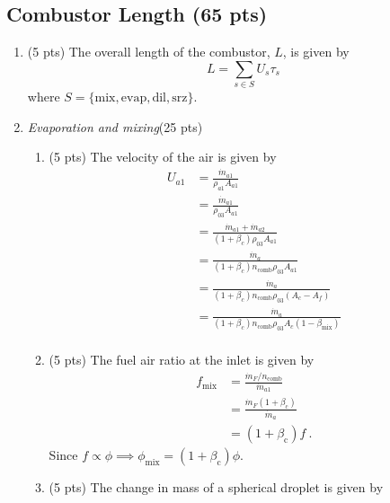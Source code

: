 \documentclass[12pt]{article}
\begin{document}
\subsection{Combustor Length (65 pts)}
	\begin{enumerate}[label=(\alph*)]
		\item (5 pts)
			The overall length of the combustor, $L$, is given by
			\begin{equation}
				L = \sum_{s\in S}U_s\tau_s
			\end{equation} 
			where $S=\{\mathrm{mix,evap,dil,srz}\}$.
		\item \textit{Evaporation and mixing}(25 pts)
			\begin{enumerate}[label=(\roman*)]
				\item (5 pts)
					The velocity of the air is given by
					\begin{equation}
						\begin{aligned}
							U_{a1}&=\frac{\dot{m}_{a1}}{\rho_{a1}A_{a1}}\\
							&=\frac{\dot{m}_{a1}}{\rho_{03}A_{a1}}\\
							&=\frac{\dot{m}_{a1}+\dot{m}_{a2}}{(1+\beta_c)\rho_{03}A_{a1}}\\
							&=\frac{\dot{m}_{a}}{(1+\beta_c)n_\mathrm{comb}\rho_{03}A_{a1}}\\
							&=\frac{\dot{m}_{a}}{(1+\beta_c)n_\mathrm{comb}\rho_{03}(A_{c}-A_f)}\\
							&=\boxed{\frac{\dot{m}_{a}}{(1+\beta_c)n_\mathrm{comb}\rho_{03}A_c(1-\beta_\mathrm{mix})}}\\
						\end{aligned}
					\end{equation}
				\item (5 pts)
					The fuel air ratio at the inlet is given by
					\begin{equation}
						\begin{aligned}
							f_\mathrm{mix}&=\frac{\dot{m}_F/n_\mathrm{comb}}{\dot{m}_{a1}}\\
							&=\frac{\dot{m}_F(1+\beta_\mathrm{c})}{\dot{m}_{a}}\\
							&=\boxed{(1+\beta_\mathrm{c})f}\ .
						\end{aligned}
					\end{equation} 
					Since $f\propto \phi\implies \boxed{\phi_\mathrm{mix}=(1+\beta_\mathrm{c})\phi}$.
				\item (5 pts)
					The change in mass of a spherical droplet is given by
					\begin{equation}

\end{equation}
\end{enumerate}
\end{enumerate}
\end{document}
